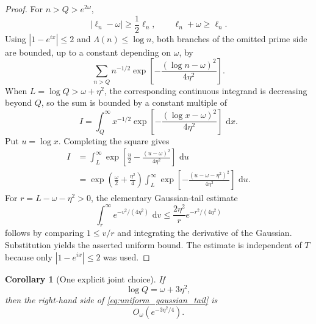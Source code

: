 \documentclass[11pt]{amsart}
\numberwithin{equation}{section}
\theoremstyle{plain}
\newtheorem{corollary}[theorem]{Corollary}
\theoremstyle{definition}
\theoremstyle{remark}
\newcommand{\1}{\mathbf{1}}
\newcommand{\dd}{\,\mathrm{d}}
\begin{document}
\begin{proof}
For \(n>Q>e^{2\omega}\),
\begin{equation}
|\ell_n-\omega|\geq\frac12\ell_n,
\qquad
\ell_n+\omega\geq\ell_n.
\label{eq:tail_denominator_bounds_detailed}
\end{equation}
Using \(|1-e^{ix}|\leq2\) and \(\Lambda(n)\leq\log n\), both branches of
the omitted prime side are bounded, up to a constant depending on
\(\omega\), by
\begin{equation}
\sum_{n>Q}n^{-1/2}
\exp\left[-\frac{(\log n-\omega)^2}{4\eta^2}\right].
\label{eq:tail_integer_sum_detailed}
\end{equation}
When \(L=\log Q>\omega+\eta^2\), the corresponding continuous integrand is
decreasing beyond \(Q\), so the sum is bounded by a constant multiple of
\begin{equation}
I
=
\int_Q^\infty x^{-1/2}
\exp\left[-\frac{(\log x-\omega)^2}{4\eta^2}\right]\,\dd x.
\label{eq:tail_integral_detailed}
\end{equation}
Put \(u=\log x\).  Completing the square gives
\begin{align}
I
&=
\int_L^\infty
\exp\left[
\frac u2-
\frac{(u-\omega)^2}{4\eta^2}
\right]\,\dd u
\label{eq:tail_square_one}
\\
&=
\exp\left(\frac\omega2+\frac{\eta^2}{4}\right)
\int_L^\infty
\exp\left[-
\frac{(u-\omega-\eta^2)^2}{4\eta^2}
\right]\,\dd u.
\label{eq:tail_square_two}
\end{align}
For \(r=L-\omega-\eta^2>0\), the elementary Gaussian-tail estimate
\begin{equation}
\int_r^\infty e^{-v^2/(4\eta^2)}\,\dd v
\leq
\frac{2\eta^2}{r}e^{-r^2/(4\eta^2)}
\label{eq:gaussian_tail_elementary}
\end{equation}
follows by comparing \(1\leq v/r\) and integrating the derivative of the
Gaussian.  Substitution yields the asserted uniform bound.  The estimate is
independent of \(T\) because only \(|1-e^{ix}|\leq2\) was used.
\end{proof}

\begin{corollary}[One explicit joint choice]
\label{cor:joint_Q_eta_choice}
If
\begin{equation}
\log Q=\omega+3\eta^2,
\label{eq:joint_Q_eta_choice}
\end{equation}
then the right-hand side of \eqref{eq:uniform_gaussian_tail} is
\begin{equation}
O_\omega(e^{-3\eta^2/4}).
\label{eq:joint_Q_eta_decay}
\end{equation}
\end{corollary}
\end{document}
